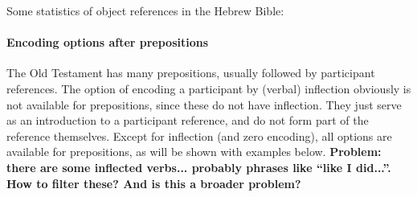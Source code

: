 \documentclass{report}
\begin{document}
Some statistics of object references in the Hebrew Bible:

\noindent
\begin{minipage}{.5\textwidth}

\end{minipage}
\begin{minipage}{.5\textwidth}
\centering

\end{minipage}

\paragraph{Encoding options after prepositions}\label{prep}
The Old Testament has many prepositions, usually followed by participant references. The option of encoding a participant by (verbal) inflection obviously is not available for prepositions, since these do not have inflection. They just serve as an introduction to a participant reference, and do not form part of the reference themselves. Except for inflection (and zero encoding), all options are available for prepositions, as will be shown with examples below.
\textbf{Problem: there are some inflected verbs... probably phrases like ``like I did...''. How to filter these? And is this a broader problem?}
\end{document}
